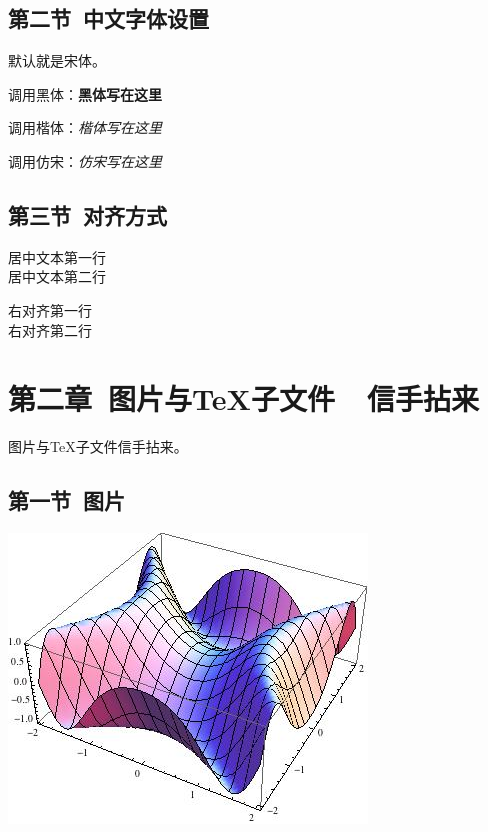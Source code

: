 \documentclass{ctexart}
\begin{document}
\subsection{第二节\ 中文字体设置}

默认就是宋体。\par
调用黑体：\textbf{黑体写在这里}\par
调用楷体：\textit{楷体写在这里}\par
调用仿宋：\textsl{仿宋写在这里}\par

\subsection{第三节\ 对齐方式}


\begin{center} 
居中文本第一行\\
居中文本第二行\\
\end{center}

\begin{flushright}
右对齐第一行\\
右对齐第二行\\
\end{flushright}




\section{第二章\ 图片与TeX子文件\ \ 信手拈来}

图片与TeX子文件信手拈来。

\subsection{第一节\ 图片}

\begin{center}
\includegraphics[scale=0.4]{include_picture/picture.jpg}\par
\end{center}
\end{document}
